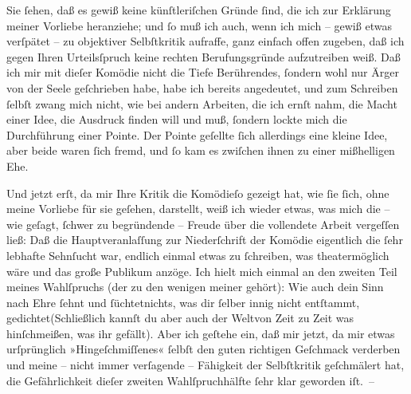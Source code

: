 \pstart
           Sie ſehen, daß es gewiß keine künſtleriſchen Gründe ſind, die ich zur Erklärung
               meiner Vorliebe heranziehe; und ſo muß ich auch, wenn {\pb}ich mich – gewiß etwas verſpätet – zu objektiver Selbſtkritik aufraffe, ganz
               einfach offen zugeben, daß ich gegen Ihren Urteilsſpruch keine rechten
               Berufungsgründe aufzutreiben weiß. Daß ich mir mit dieſer Komödie nicht die Tiefe
               Berührendes, ſondern wohl nur Ärger von der Seele geſchrieben habe, habe ich bereits
               angedeutet, und zum Schreiben ſelbſt zwang mich nicht, wie bei andern Arbeiten, die
               ich ernſt nahm, die Macht einer Idee, die Ausdruck finden will und muß, ſondern
               lockte mich die Durchführung einer Pointe. Der Pointe geſellte ſich allerdings eine
               kleine Idee, aber beide waren ſich fremd, und ſo kam es zwiſchen ihnen zu einer
               mißhelligen Ehe.\pend
           
\pstart
           Und jetzt erſt, da mir Ihre Kritik die Komödieſo gezeigt hat, wie ſie ſich, ohne meine Vorliebe
               für sie geſehen, darstellt, weiß ich wieder etwas,
               was mich die – wie geſagt, ſchwer zu begründende – Freude über die vollendete Arbeit
               vergeſſen ließ: Daß die Hauptveranlaſſung zur Niederſchrift der Komödie eigentlich
               die ſehr lebhafte Sehnſucht war, endlich einmal etwas zu ſchreiben, was
               theatermöglich wäre und das große Publikum anzöge. Ich hielt mich einmal an den
               zweiten Teil meines Wahlſpruchs (der zu den wenigen meiner \label{K_L02215-1v}\label{K_L02215-1} gehört):\pend
           \stanza{}{\pb}Wie auch dein Sinn nach Ehre
                     ſehnt und ſüchtetnichts, was dir ſelber innig
                     nicht entſtammt, gedichtet(Schließlich kannſt du aber auch
                     der Weltvon Zeit zu Zeit was
                     hinſchmeißen, was ihr gefällt).\stanzaend{}
\pstart
           Aber ich geſtehe ein, daß mir jetzt, da mir etwas urſprünglich »Hingeſchmiſſenes«
               ſelbſt den guten richtigen Geſchmack verderben und meine – nicht immer verſagende –
               Fähigkeit der Selbſtkritik geſchmälert hat, die Gefährlichkeit dieſer zweiten
               Wahlſpruchhälfte ſehr klar geworden iſt. –\pend
           
